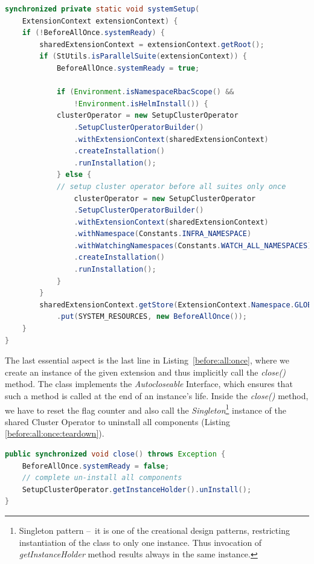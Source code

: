 \begin{lstlisting}[language= Java,label=before:all:once,caption=Setup phase of shared Cluster Operator,frame=tb]
synchronized private static void systemSetup(
    ExtensionContext extensionContext) {
    if (!BeforeAllOnce.systemReady) {
        sharedExtensionContext = extensionContext.getRoot();
        if (StUtils.isParallelSuite(extensionContext)) {
            BeforeAllOnce.systemReady = true;

            if (Environment.isNamespaceRbacScope() &&
                !Environment.isHelmInstall()) {
            clusterOperator = new SetupClusterOperator
                .SetupClusterOperatorBuilder()
                .withExtensionContext(sharedExtensionContext)
                .createInstallation()
                .runInstallation();
            } else {
            // setup cluster operator before all suites only once
                clusterOperator = new SetupClusterOperator
                .SetupClusterOperatorBuilder()
                .withExtensionContext(sharedExtensionContext)
                .withNamespace(Constants.INFRA_NAMESPACE)
                .withWatchingNamespaces(Constants.WATCH_ALL_NAMESPACES)
                .createInstallation()
                .runInstallation();
            }
        }
        sharedExtensionContext.getStore(ExtensionContext.Namespace.GLOBAL)
            .put(SYSTEM_RESOURCES, new BeforeAllOnce());
    }
}
\end{lstlisting}
The last essential aspect is the last line in Listing~\ref{before:all:once}, where we create an instance of the given
extension and thus implicitly call the \emph{close()} method.
The class implements the \emph{Autocloseable} Interface, which ensures that such a method is called at the end of an instance's life.
Inside the \emph{close()} method, we have to reset the flag counter and also call the
\emph{Singleton}\footnote{Singleton pattern \---\ it is one of the creational design patterns, restricting instantiation of the class to only one instance.
Thus invocation of \emph{getInstanceHolder} method results always in the same instance.} instance of the shared Cluster Operator
to uninstall all components (Listing \ref{before:all:once:teardown}).


\begin{lstlisting}[language= Java,label=before:all:once:teardown,caption=Teardown phase of shared Cluster Operator,frame=tb]
public synchronized void close() throws Exception {
    BeforeAllOnce.systemReady = false;
    // complete un-install all components
    SetupClusterOperator.getInstanceHolder().unInstall();
}
\end{lstlisting}

